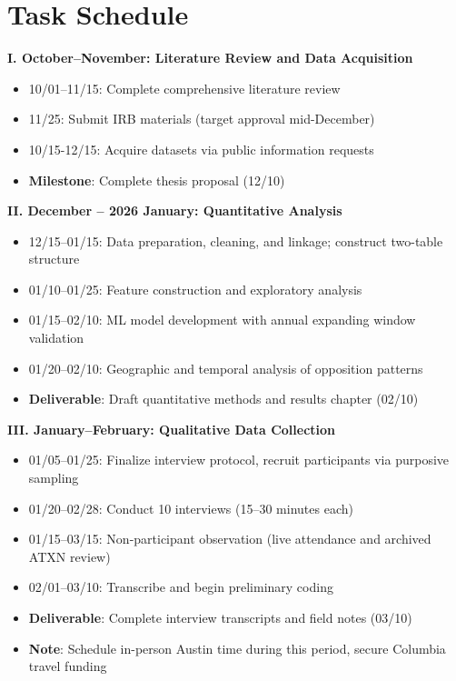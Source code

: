 \documentclass[12pt]{article}
\begin{document}
\section{Task Schedule}
{\small

\noindent\textbf{I. October--November: Literature Review and Data Acquisition}
\begin{itemize}[noitemsep,leftmargin=2em]
    \item 10/01--11/15: Complete comprehensive literature review
    \item 11/25: Submit IRB materials (target approval mid-December)
    \item 10/15-12/15: Acquire datasets via public information requests
    \item \textbf{Milestone}: Complete thesis proposal (12/10)
\end{itemize}

\noindent\textbf{II. December -- 2026 January: Quantitative Analysis}
\begin{itemize}[noitemsep,leftmargin=2em]
    \item 12/15--01/15: Data preparation, cleaning, and linkage; construct two-table structure
    \item 01/10--01/25: Feature construction and exploratory analysis
    \item 01/15--02/10: ML model development with annual expanding window validation
    \item 01/20--02/10: Geographic and temporal analysis of opposition patterns
    \item \textbf{Deliverable}: Draft quantitative methods and results chapter (02/10)
\end{itemize}

\noindent\textbf{III. January--February: Qualitative Data Collection}
\begin{itemize}[noitemsep,leftmargin=2em]
    \item 01/05--01/25: Finalize interview protocol, recruit participants via purposive sampling
    \item 01/20--02/28: Conduct 10 interviews (15--30 minutes each)
    \item 01/15--03/15: Non-participant observation (live attendance and archived ATXN review)
    \item 02/01--03/10: Transcribe and begin preliminary coding
    \item \textbf{Deliverable}: Complete interview transcripts and field notes (03/10)
    \item \textbf{Note}: Schedule in-person Austin time during this period, secure Columbia travel funding
\end{itemize}

}
\end{document}
